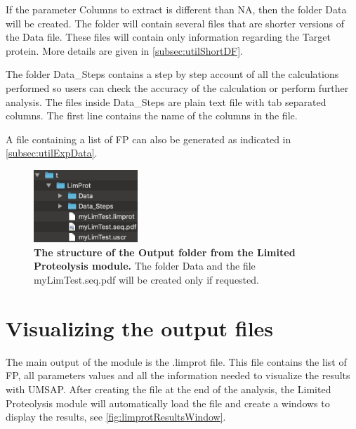 If the parameter Columns to extract is different than NA, then the folder Data will be created. The folder will contain several files that are shorter versions of the Data file. These files will contain only information regarding the Target protein. More details are given in \autoref{subsec:utilShortDF}.

The folder Data\_Steps contains a step by step account of all the calculations performed so users can check the accuracy of the calculation or perform further analysis. The files inside Data\_Steps are plain text file with tab separated columns. The first line contains the name of the columns in the file.

A file containing a list of FP can also be generated as indicated in \autoref{subsec:utilExpData}.

\begin{figure}[h]
    \centering
    \includegraphics[width=0.35\textwidth]{./IMAGES/MOD-LIMPROT/limprot-files.jpg}	    
    \caption[The structure of the Output folder from the Limited Proteolysis module]{\textbf{The structure of the Output folder from the Limited Proteolysis module.} The folder Data and the file myLimTest.seq.pdf will be created only if requested.} 
    \label{fig:limprotOutFolder}
    \vspace{-5pt} 	
\end{figure}

\section{Visualizing the output files}

The main output of the module is the .limprot file. This file contains the list of FP,  all parameters values and all the information needed to visualize the results with UMSAP. After creating the file at the end of the analysis, the Limited Proteolysis module will automatically load the file and create a windows to display the results, see \autoref{fig:limprotResultsWindow}.

